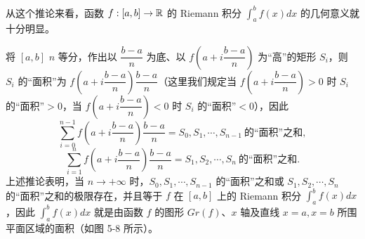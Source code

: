 从这个推论来看，函数 \(f:[a,b]\to\mathbb{R}\) 的 Riemann 积分 \(\int_a^b f(x)dx\) 的几何意义就十分明显。

将 \([a,b]\) \(n\) 等分，作出以 \(\dfrac{b-a}{n}\) 为底、以 \(f\left(a+i\dfrac{b-a}{n}\right)\) 为“高”的矩形 \(S_i\)，则 \(S_i\) 的“面积”为 \(f\left(a+i\dfrac{b-a}{n}\right)\dfrac{b-a}{n}\)（这里我们规定当 \(f\left(a+i\dfrac{b-a}{n}\right)>0\) 时 \(S_i\) 的“面积”\(>0\)，当 \(f\left(a+i\dfrac{b-a}{n}\right)<0\) 时 \(S_i\) 的“面积”\(<0\)），因此
\[
\sum_{i=0}^{n-1}f\left(a+i\frac{b-a}{n}\right)\frac{b-a}{n}=S_0,S_1,\cdots,S_{n-1}\ \text{的“面积”之和},
\]
\[
\sum_{i=1}^n f\left(a+i\frac{b-a}{n}\right)\frac{b-a}{n}=S_1,S_2,\cdots,S_n\ \text{的“面积”之和}.
\]
上述推论表明，当 \(n\to+\infty\) 时，\(S_0,S_1,\cdots,S_{n-1}\) 的“面积”之和或 \(S_1,S_2,\cdots,S_n\) 的“面积”之和的极限存在，并且等于 \(f\) 在 \([a,b]\) 上的 Riemann 积分 \(\int_a^b f(x)dx\)，因此 \(\int_a^b f(x)dx\) 就是由函数 \(f\) 的图形 \(Gr(f)\)、\(x\) 轴及直线 \(x=a,x=b\) 所围平面区域的面积（如图 5-8 所示）。

